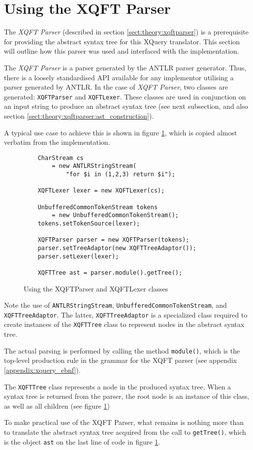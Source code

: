\section{Using the XQFT Parser}
The \textit{XQFT Parser}\cite{ourselves} (described in section
\ref{sect:theory:xqftparser}) is a prerequisite for providing the abstract
syntax tree for this XQuery translator. This section will outline how this
parser was used and interfaced with the implementation.

The \textit{XQFT Parser} is a parser generated by the ANTLR parser generator.
Thus, there is a loosely standardised API available for any implementor
utilising a parser generated by ANTLR. In the case of \textit{XQFT Parser}, two
classes are generated: \texttt{XQFTParser} and \texttt{XQFTLexer}. These
classes are used in conjunction on an input string to produce an abstract syntax
tree (see next subsection, and also section
\ref{sect:theory:xqftparser:ast_construction}).

A typical use case to achieve this is shown in figure
\ref{figure:impl:using_xqft}, which is copied almost verbatim from the
implementation.

\begin{figure}[!htp]
\begin{center}
  \begin{Verbatim}
    CharStream cs 
        = new ANTLRStringStream(
            "for $i in (1,2,3) return $i");

    XQFTLexer lexer = new XQFTLexer(cs);

    UnbufferedCommonTokenStream tokens 
        = new UnbufferedCommonTokenStream();
	tokens.setTokenSource(lexer);

    XQFTParser parser = new XQFTParser(tokens);
    parser.setTreeAdaptor(new XQFTTreeAdaptor());
    parser.setLexer(lexer);

    XQFTTree ast = parser.module().getTree();
  \end{Verbatim}
  \caption{Using the XQFTParser and XQFTLexer classes}
  \label{figure:impl:using_xqft}
\end{center}
\end{figure}
Note the use of \texttt{ANTLRStringStream},
\texttt{UnbufferedCommonTokenStream}, and \texttt{XQFTTreeAdaptor}. The latter,
\texttt{XQFTTreeAdaptor} is a specialized class required to create instances of
the \texttt{XQFTTree} class to represent nodes in the abstract syntax tree.

The actual parsing is performed by calling the method \texttt{module()}, which
is the top-level production rule in the grammar for the XQFT parser (see
appendix \ref{appendix:xquery_ebnf}).

The \texttt{XQFTTree} class represents a node in the produced syntax tree. When
a syntax tree is returned from the parser, the root node is an instance of this
class, as well as all children (see figure \ref{figure:impl:using_xqft})

To make practical use of the XQFT Parser, what remains is nothing more than to
translate the abstract syntax tree acquired from the call to
\texttt{getTree()}, which is the object \texttt{ast} on the last line of code
in figure \ref{figure:impl:using_xqft}.
